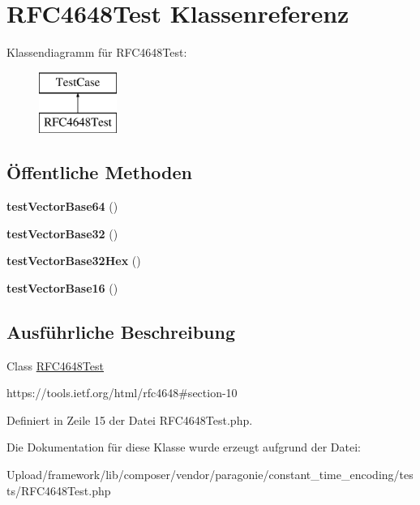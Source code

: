 \hypertarget{class_r_f_c4648_test}{}\section{R\+F\+C4648\+Test Klassenreferenz}
\label{class_r_f_c4648_test}
Klassendiagramm für R\+F\+C4648\+Test\+:\begin{figure}[H]
\begin{center}
\leavevmode
\includegraphics[height=2.000000cm]{class_r_f_c4648_test}
\end{center}
\end{figure}
\subsection*{Öffentliche Methoden}
\begin{DoxyCompactItemize}
\item 
\mbox{\label{class_r_f_c4648_test_a707327548885466bbdb6243dce4c30b5}} 
{\bfseries test\+Vector\+Base64} ()
\item 
\mbox{\label{class_r_f_c4648_test_a1330784f54a8579f507c36f857eb8adb}} 
{\bfseries test\+Vector\+Base32} ()
\item 
\mbox{\label{class_r_f_c4648_test_a268f1f96c5699b7928e58b9f13295fd4}} 
{\bfseries test\+Vector\+Base32\+Hex} ()
\item 
\mbox{\label{class_r_f_c4648_test_a235c87705117b150fbd0bc93ec4d0490}} 
{\bfseries test\+Vector\+Base16} ()
\end{DoxyCompactItemize}


\subsection{Ausführliche Beschreibung}
Class \mbox{\hyperlink{class_r_f_c4648_test}{R\+F\+C4648\+Test}}

https\+://tools.ietf.\+org/html/rfc4648\#section-\/10 

Definiert in Zeile 15 der Datei R\+F\+C4648\+Test.\+php.



Die Dokumentation für diese Klasse wurde erzeugt aufgrund der Datei\+:\begin{DoxyCompactItemize}
\item 
Upload/framework/lib/composer/vendor/paragonie/constant\+\_\+time\+\_\+encoding/tests/R\+F\+C4648\+Test.\+php\end{DoxyCompactItemize}
